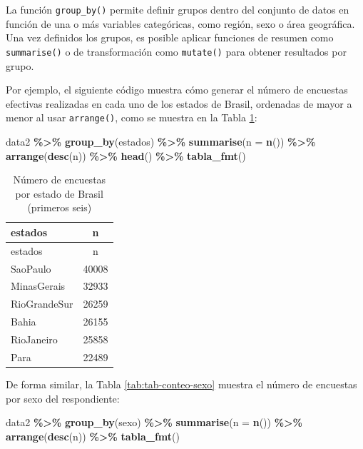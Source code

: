 \documentclass[
  spanish,
  12pt,
]{book}
\newenvironment{Shaded}{\begin{snugshade}}{\end{snugshade}}
\newcommand{\AttributeTok}[1]{\textcolor[rgb]{0.13,0.29,0.53}{#1}}
\newcommand{\FunctionTok}[1]{\textcolor[rgb]{0.13,0.29,0.53}{\textbf{#1}}}
\newcommand{\NormalTok}[1]{#1}
\newcommand{\SpecialCharTok}[1]{\textcolor[rgb]{0.81,0.36,0.00}{\textbf{#1}}}
\begin{document}
La función \texttt{group\_by()} permite definir grupos dentro del conjunto de datos en función de una o más variables categóricas, como región, sexo o área geográfica. Una vez definidos los grupos, es posible aplicar funciones de resumen como \texttt{summarise()} o de transformación como \texttt{mutate()} para obtener resultados por grupo.

Por ejemplo, el siguiente código muestra cómo generar el número de encuestas efectivas realizadas en cada uno de los estados de Brasil, ordenadas de mayor a menor al usar \texttt{arrange()}, como se muestra en la Tabla \ref{tab:tab-estados-brasil}:

\begin{Shaded}
\begin{Highlighting}[]
\NormalTok{data2 }\SpecialCharTok{\%\textgreater{}\%} 
  \FunctionTok{group\_by}\NormalTok{(estados) }\SpecialCharTok{\%\textgreater{}\%} 
  \FunctionTok{summarise}\NormalTok{(}\AttributeTok{n =} \FunctionTok{n}\NormalTok{()) }\SpecialCharTok{\%\textgreater{}\%} 
  \FunctionTok{arrange}\NormalTok{(}\FunctionTok{desc}\NormalTok{(n)) }\SpecialCharTok{\%\textgreater{}\%} 
  \FunctionTok{head}\NormalTok{() }\SpecialCharTok{\%\textgreater{}\%}
  \FunctionTok{tabla\_fmt}\NormalTok{()}
\end{Highlighting}
\end{Shaded}

\begin{longtable}[]{@{}lc@{}}
\caption{\label{tab:tab-estados-brasil}Número de encuestas por estado de Brasil (primeros seis)}\tabularnewline
\toprule\noalign{}
estados & n \\
\midrule\noalign{}
\endfirsthead
\toprule\noalign{}
estados & n \\
\midrule\noalign{}
\endhead
\bottomrule\noalign{}
\endlastfoot
SaoPaulo & 40008 \\
MinasGerais & 32933 \\
RioGrandeSur & 26259 \\
Bahia & 26155 \\
RioJaneiro & 25858 \\
Para & 22489 \\
\end{longtable}

De forma similar, la Tabla \ref{tab:tab-conteo-sexo} muestra el número de encuestas por sexo del respondiente:

\begin{Shaded}
\begin{Highlighting}[]
\NormalTok{data2 }\SpecialCharTok{\%\textgreater{}\%} 
  \FunctionTok{group\_by}\NormalTok{(sexo) }\SpecialCharTok{\%\textgreater{}\%} 
  \FunctionTok{summarise}\NormalTok{(}\AttributeTok{n =} \FunctionTok{n}\NormalTok{()) }\SpecialCharTok{\%\textgreater{}\%} 
  \FunctionTok{arrange}\NormalTok{(}\FunctionTok{desc}\NormalTok{(n)) }\SpecialCharTok{\%\textgreater{}\%}
  \FunctionTok{tabla\_fmt}\NormalTok{()}
\end{Highlighting}
\end{Shaded}
\end{document}
